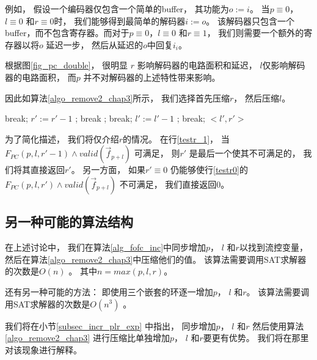 例如，
假设一个编码器仅包含一个简单的buffer，
其功能为$o:=i$。
当$p\equiv 0$，$l\equiv 0$ 和$r\equiv 0$时，
我们能够得到最简单的解码器$i:=o$。
该解码器只包含一个buffer，而不包含寄存器。而对于$p\equiv 0$，$l\equiv 0$ 和$r\equiv 1$，
我们则需要一个额外的寄存器以将$o$ 延迟一步，
然后从延迟的$o$中回复$i_i$。

根据图\ref{fig_pc_double}，
很明显
$r$ 影响解码器的电路面积和延迟，
$l$仅影响解码器的电路面积，
而$p$ 并不对解码器的上述特性带来影响。

因此如算法\ref{algo_remove2_chap3}所示，
我们选择首先压缩$r$，
然后压缩$l$。

\begin{algorithm}[t]
\caption{$RemoveRedundancy(p,l,r)$}
\label{algo_remove2_chap3}
\begin{algorithmic}[1]
\label{testr_1}
    \STATE break;
\label{testr0}
    \STATE $r':=r'-1$ ;
    \STATE break ;
  \ENDIF
\ENDFOR
{}
    \STATE break;
    \STATE $l':=l'-1$ ;
    \STATE break;
  \ENDIF
\ENDFOR
\RETURN $<l',r'>$
\end{algorithmic}
\end{algorithm}

为了简化描述，
我们将仅介绍$r$的情况。
在行\ref{testr_1}，
当$F_{PC}(p,l,r'-1)\wedge valid(\vec{f}_{p+l})$ 可满足，
则$r'$ 是最后一个使其不可满足的，
我们将其直接返回$r'$。
另一方面，
如果$r'\equiv 0$ 仍能够使行\ref{testr0}的$F_{PC}(p,l,r')\wedge valid(\vec{f}_{p+l})$ 不可满足，
我们直接返回0。

\subsection{另一种可能的算法结构}\label{alter}

在上述讨论中，
我们在算法\ref{alg_fofc_inc}中同步增加$p$， $l$ 和$r$以找到流控变量，
然后在算法\ref{algo_remove2_chap3}中压缩他们的值。
该算法需要调用SAT求解器的次数是$O(n)$ 。
其中$n=max(p,l,r)$。

还有另一种可能的方法：
即使用三个嵌套的环逐一增加$p$， $l$ 和$r$。
该算法需要调用SAT求解器的次数是$O(n^3)$ 。


我们将在小节\ref{subsec_incr_plr_exp} 中指出，
同步增加$p$， $l$ 和$r$ 然后使用算法\ref{algo_remove2_chap3} 进行压缩比单独增加$p$， $l$ 和$r$要更有优势。
我们将在那里对该现象进行解释。





